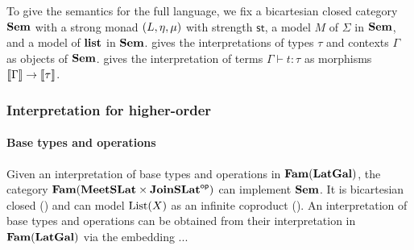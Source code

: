 To give the semantics for the full language, we fix a bicartesian closed category $\mathbf{Sem}$ with a strong monad
$(L, \eta, \mu)$ with strength $\mathsf{st}$, a model $M$ of $\Sigma$ in $\mathbf{Sem}$, and a model of $\mathbf{list}$
in $\mathbf{Sem}$.  gives the interpretations of types $\tau$ and contexts $\Gamma$ as objects
of $\mathbf{Sem}$.  gives the interpretation of terms $\Gamma \vdash t: \tau$ as morphisms
$\llbracket \Gamma \rrbracket \to \llbracket \tau \rrbracket$.

\subsubsection{Interpretation for higher-order \GPS}

\paragraph{Base types and operations}
Given an interpretation of base types and operations in $\mathbf{Fam}(\mathbf{LatGal})$, the category $\mathbf{Fam}(\mathbf{MeetSLat} \times
\mathbf{JoinSLat}^{\mathsf{op}})$ can implement $\mathbf{Sem}$. It is bicartesian closed () and can model
$\mathrm{List}(X)$ as an infinite coproduct (). An interpretation
of base types and operations can be obtained from their interpretation in $\mathbf{Fam}(\mathbf{LatGal})$ via the embedding
...
